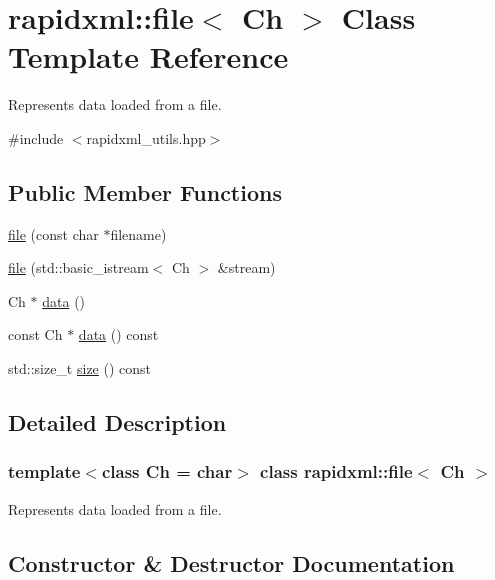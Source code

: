 \hypertarget{classrapidxml_1_1file}{}\section{rapidxml\+:\+:file$<$ Ch $>$ Class Template Reference}
\label{classrapidxml_1_1file}


Represents data loaded from a file.  




{\ttfamily \#include $<$rapidxml\+\_\+utils.\+hpp$>$}

\subsection*{Public Member Functions}
\begin{DoxyCompactItemize}
\item 
\hyperlink{classrapidxml_1_1file_ae881a3cab1fe7152d45c92a8d7606cb3}{file} (const char $\ast$filename)
\item 
\hyperlink{classrapidxml_1_1file_a90707ccd991cc392dcf4bef37eed9d1f}{file} (std\+::basic\+\_\+istream$<$ Ch $>$ \&stream)
\item 
Ch $\ast$ \hyperlink{classrapidxml_1_1file_af1c71d65862c7af14e4708e32a80c1de}{data} ()
\item 
const Ch $\ast$ \hyperlink{classrapidxml_1_1file_a044bdd99e59157b8a5a1b28c2f32da4d}{data} () const
\item 
std\+::size\+\_\+t \hyperlink{classrapidxml_1_1file_aacd451b3def3ad056fe8342dccee35cd}{size} () const
\end{DoxyCompactItemize}


\subsection{Detailed Description}
\subsubsection*{template$<$class Ch = char$>$\newline
class rapidxml\+::file$<$ Ch $>$}

Represents data loaded from a file. 

\subsection{Constructor \& Destructor Documentation}
\mbox{\label{classrapidxml_1_1file_ae881a3cab1fe7152d45c92a8d7606cb3}} 
